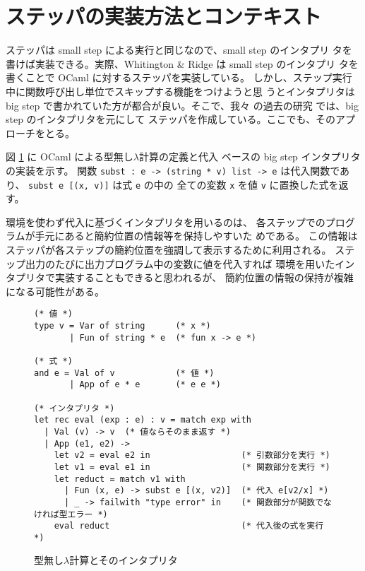 \section{ステッパの実装方法とコンテキスト}
\label{section:context}

ステッパは small step による実行と同じなので、small step のインタプリ
タを書けば実装できる。実際、Whitington \& Ridge \cite{EPTCS294.3} は small step のインタプリ
タを書くことで OCaml に対するステッパを実装している。
しかし、ステップ実行中に関数呼び出し単位でスキップする機能をつけようと思
うとインタプリタは big step で書かれていた方が都合が良い。そこで、我々
の過去の研究 \cite{FCA19} では、big step のインタプリタを元にして
ステッパを作成している。ここでも、そのアプローチをとる。

図 \ref{figure:lambda} に OCaml による型無し$\lambda$計算の定義と代入
ベースの big step インタプリタの実装を示す。
関数 \texttt{subst :\ e -> (string * v) list -> e} は代入関数であり、
\texttt{subst e [(x, v)]} は式 \texttt{e} の中の
全ての変数 \texttt{x} を値 \texttt{v} に置換した式を返す。

環境を使わず代入に基づくインタプリタを用いるのは、
各ステップでのプログラムが手元にあると簡約位置の情報等を保持しやすいた
めである。
この情報はステッパが各ステップの簡約位置を強調して表示するために利用される。
ステップ出力のたびに出力プログラム中の変数に値を代入すれば
環境を用いたインタプリタで実装することもできると思われるが、
簡約位置の情報の保持が複雑になる可能性がある。


\begin{figure}
\begin{spacing}{0.9}
\begin{verbatim}
(* 値 *)
type v = Var of string      (* x *)
       | Fun of string * e  (* fun x -> e *)

(* 式 *)
and e = Val of v            (* 値 *)
       | App of e * e       (* e e *)

(* インタプリタ *)
let rec eval (exp : e) : v = match exp with
  | Val (v) -> v  (* 値ならそのまま返す *)
  | App (e1, e2) ->
    let v2 = eval e2 in                  (* 引数部分を実行 *)
    let v1 = eval e1 in                  (* 関数部分を実行 *)
    let reduct = match v1 with
      | Fun (x, e) -> subst e [(x, v2)]  (* 代入 e[v2/x] *)
      | _ -> failwith "type error" in    (* 関数部分が関数でなければ型エラー *)
    eval reduct                          (* 代入後の式を実行 *)
\end{verbatim}
\caption{型無し$\lambda$計算とそのインタプリタ}
\label{figure:lambda}
\end{spacing}
\end{figure}

